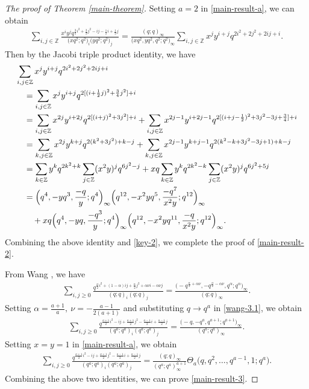 \documentclass[10pt,a4paper]{amsart}
\numberwithin{equation}{section}
\theoremstyle{definition}
\begin{document}
\begin{proof}[The proof of Theorem \ref{main-theorem}]
Setting $a=2$ in \eqref{main-result-a}, we can obtain
\begin{align}\label{key-2}
\sum_{i,j\in\mathbb{Z}}\frac{x^iy^jq^{\frac{3}{2}i^2+\frac{3}{2}j^2-ij-\frac{1}{2}i +\frac{1}{2}j}}{\bigl(xq^2;q^2\bigr)_i\bigl(yq^2;q^2\bigr)_j} =\frac{(q;q)_{\infty}}{\bigl(xq^2,yq^2,q^2;q^2\bigr)_{\infty}}\sum_{i,j\in\mathbb{Z}}x^jy^{i+j}q^{2i^2+2j^2+2ij+i}.
\end{align}
Then by the Jacobi triple product identity, we have
\begin{align*}
&\sum_{i,j\in\mathbb{Z}}x^jy^{i+j}q^{2i^2+2j^2+2ij+i}\\
& \quad =\sum_{i,j\in\mathbb{Z}}x^jy^{i+j}q^{2[(i+\frac{1}{2}j)^2+\frac{3}{4}j^2]+i}\\
& \quad = \sum_{i,j\in\mathbb{Z}}x^{2j}y^{i+2j}q^{2[(i+j)^2+3j^2]+i}+\sum_{i,j\in\mathbb{Z}}x^{2j-1}y^{i+2j-1}q^{2[(i+j-\frac{1}{2})^2+3j^2-3j+\frac{3}{4}]+i}\\
& \quad =\sum_{k,j\in\mathbb{Z}}x^{2j}y^{k+j}q^{2(k^2+3j^2)+k-j}+\sum_{k,j\in\mathbb{Z}}x^{2j-1}y^{k+j-1}q^{2(k^2-k+3j^2-3j+1)+k-j}\\
& \quad =\sum_{k\in\mathbb{Z}}y^kq^{2k^2+k}\sum_{j\in\mathbb{Z}}(x^2y)^jq^{6j^2-j}+xq\sum_{k\in\mathbb{Z}}y^kq^{2k^2-k}\sum_{j\in\mathbb{Z}}(x^2y)^jq^{6j^2+5j}\\
& \quad =\Bigl(q^4,-yq^3,\frac{-q}{y};q^4\Bigr)_{\infty}\Bigl(q^{12},-x^2yq^5,\frac{-q^7}{x^2y};q^{12}\Bigr)_{\infty}\\
&\qquad +xq\Bigl(q^4,-yq,\frac{-q^3}{y};q^4\Bigr)_{\infty}\Bigl(q^{12},-x^2yq^{11},\frac{-q}{x^2y};q^{12}\Bigr)_{\infty}.
\end{align*}
Combining the above identity and \eqref{key-2}, we complete the proof of \eqref{main-result-2}.

From Wang \cite[equation~(3.1)]{Wang-2024-2}, we have
\begin{align}\label{wang-3.1}
\sum_{i,j\geq0}\frac{q^{\frac{\alpha}{2}i^2+(1-\alpha)ij+\frac{\alpha}{2}j^2+\alpha\nu i-\alpha\nu j}}{(q;q)_i(q;q)_j} =\frac{\bigl(-q^{\frac{\alpha}{2}+\alpha\nu},-q^{\frac{\alpha}{2}-\alpha\nu},q^{\alpha};q^{\alpha}\bigr)_{\infty}}{(q;q)_{\infty}}.
\end{align}
Setting $\alpha=\frac{a+1}{a},~\nu=-\frac{a-1}{2(a+1)}$ and substituting $q\rightarrow q^a$ in \eqref{wang-3.1}, we obtain
\begin{align*}
\sum_{i,j\geq0}\frac{q^{\frac{a+1}{2}i^2-ij+\frac{a+1}{2}j^2-\frac{a-1}{2}i+\frac{a-1}{2} j}}{(q^a;q^a)_i(q^a;q^a)_j}=\frac{\bigl(-q,-q^a,q^{a+1};q^{a+1}\bigr)_{\infty}}{(q^a;q^a)_{\infty}}.
\end{align*}
Setting $x=y=1$ in \eqref{main-result-a}, we obtain
\begin{align*}
\sum_{i,j\geq0}\frac{q^{\frac{a+1}{2}i^2-ij+\frac{a+1}{2}j^2-\frac{a-1}{2}i+\frac{a-1}{2} j}}{(q^a;q^a)_i(q^a;q^a)_j}=\frac{(q;q)_{\infty}}{(q^a;q^a)^{a+1}_{\infty}}\Theta_a\bigl(q,q^2,\dots,q^{a-1},1;q^a\bigr).
\end{align*}
Combining the above two identities, we can prove \eqref{main-result-3}.
\end{proof}
\end{document}
